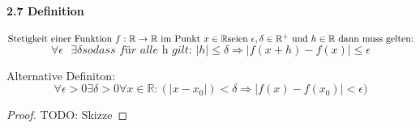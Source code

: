 \documentclass[a4paper]{article}
\begin{document}
\paragraph{2.7 Definition} $ \text{Stetigkeit einer Funktion } f:\mathbb{R} \to \mathbb{R} \text{ im Punkt } x \in \mathbb{R} \\
\text{seien }\epsilon, \delta  \in \mathbb{R}^+ \text{ und } h \in \mathbb{R} \text{ dann muss gelten:}$
$$ \forall \epsilon \text{ } \exists \delta \textit{sodass für alle h gilt: } |h| \leqslant \delta \Rightarrow |f(x + h) - f(x)| \leqslant \epsilon $$ 

Alternative Definiton:
$$ \forall \epsilon > 0 \exists \delta > 0 \forall x \in \mathbb{R}: (|x - x_0|) < \delta \Rightarrow |f(x) - f(x_0) | < \epsilon)$$
\begin{proof}
      
      TODO: Skizze
\end{proof}
\end{document}
